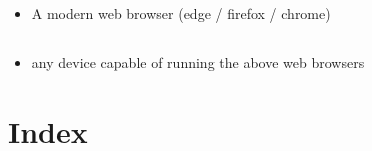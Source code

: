 \documentclass[letterpaper]{article}
\begin{document}
  \subsection{}
    \begin{itemize}
      \item A modern web browser (edge / firefox / chrome)
    \end{itemize}

    \subsection{}
      \begin{itemize}
        \item any device capable of running the above web browsers
      \end{itemize}

\pagebreak

\section{Index}
\printindex
\listoffigures
\pagebreak
\end{document}
